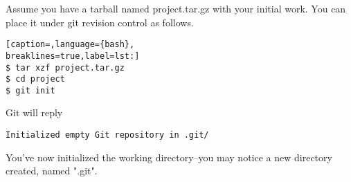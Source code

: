 Assume you have a tarball named project.tar.gz with your initial work. You can
place it under git revision control as follows.

\lstset{basicstyle=\scriptsize, numbers=none, captionpos=b, tabsize=4}
\begin{lstlisting}[caption=,language={bash},
breaklines=true,label=lst:]
$ tar xzf project.tar.gz
$ cd project
$ git init
\end{lstlisting}

Git will reply

\scriptsize
\begin{verbatim}
Initialized empty Git repository in .git/
\end{verbatim}
\normalsize

You've now initialized the working directory--you may notice a new directory
created, named ".git".
